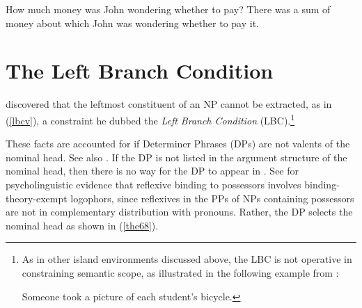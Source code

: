 \documentclass[output=paper
 	        ,biblatex
                ,babelshorthands
                ,newtxmath
                ,draftmode
                ,colorlinks, citecolor=brown
]{langscibook}
\begin{document}
\eal \label{kro}
\ex How much money was John wondering whether to pay?
\ex There was a sum of money about which John was wondering whether
to pay it.
\zl


\section{The Left Branch Condition}

\citet[207]{Ross67} discovered that the leftmost constituent of an NP cannot be extracted, as in
(\ref{lbcv}), a constraint he dubbed the \emph{Left Branch Condition} (LBC).\footnote{As in other
  island environments discussed above, the LBC is not operative in constraining semantic scope, as
  illustrated in the following example from :

\ea
Someone took a picture of each student's bicycle.
\zlast}
 
 
\eal \label{lbcv}
 

\zl


\noindent
These facts are accounted for if Determiner Phrases (DPs) are not valents of the nominal head. See also . If the DP is not listed in the argument
  structure of the nominal head, then there is no way for the DP to appear in \SLASH.  See
  \citet{runner06} for psycholinguistic evidence that reflexive binding to possessors involves
  binding-theory-exempt logophors, since reflexives in the PPs of NPs containing possessors are not
  in complementary distribution with pronouns.  Rather, the DP selects the nominal head as shown in
(\ref{the68}).

\ea \label{the68}
\z
\end{document}
